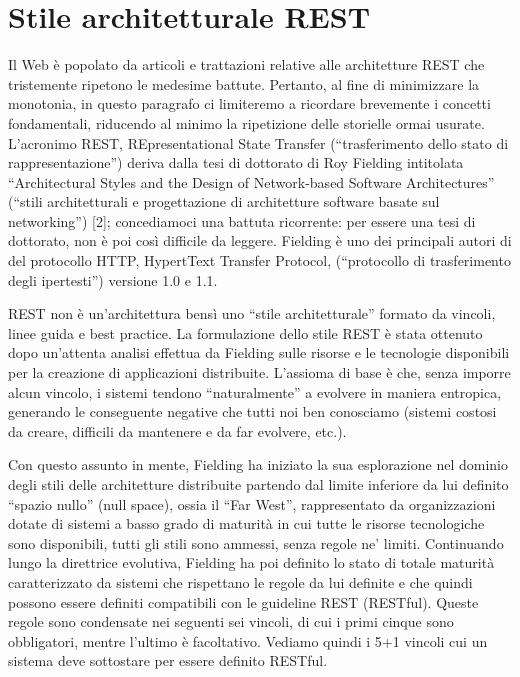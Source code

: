 \section{Stile architetturale REST}
Il Web \`e popolato da articoli e trattazioni relative alle architetture REST che tristemente ripetono le medesime battute. Pertanto, al fine di minimizzare la monotonia, in questo paragrafo ci limiteremo a ricordare brevemente i concetti fondamentali, riducendo al minimo la ripetizione delle storielle ormai usurate. L’acronimo REST, REpresentational State Transfer (“trasferimento dello stato di rappresentazione”) deriva dalla tesi di dottorato di Roy Fielding intitolata “Architectural Styles and the Design of Network-based Software Architectures” (“stili architetturali e progettazione di architetture software basate sul networking”) [2]; concediamoci una battuta ricorrente: per essere una tesi di dottorato, non \`e poi cos\`i difficile da leggere. Fielding \`e uno dei principali autori di del protocollo HTTP, HypertText Transfer Protocol, (“protocollo di trasferimento degli ipertesti”) versione 1.0 e 1.1.

REST non \`e un’architettura bens\`i uno “stile architetturale” formato da vincoli, linee guida e best practice. La formulazione dello stile REST \`e stata ottenuto dopo un’attenta analisi effettua da Fielding sulle risorse e le tecnologie disponibili per la creazione di applicazioni distribuite. L’assioma di base \`e che, senza imporre alcun vincolo, i sistemi tendono “naturalmente” a evolvere in maniera entropica, generando le conseguente negative che tutti noi ben conosciamo (sistemi costosi da creare, difficili da mantenere e da far evolvere, etc.).

Con questo assunto in mente, Fielding ha iniziato la sua esplorazione nel dominio degli stili delle architetture distribuite partendo dal limite inferiore da lui definito “spazio nullo” (null space), ossia il “Far West”, rappresentato da organizzazioni dotate di sistemi a basso grado di maturit\`a in cui tutte le risorse tecnologiche sono disponibili, tutti gli stili sono ammessi, senza regole ne’ limiti. Continuando lungo la direttrice evolutiva, Fielding ha poi definito lo stato di totale maturit\`a caratterizzato da sistemi che rispettano le regole da lui definite e che quindi possono essere definiti compatibili con le guideline REST (RESTful). Queste regole sono condensate nei seguenti sei vincoli, di cui i primi cinque sono obbligatori, mentre l’ultimo \`e facoltativo. Vediamo quindi i 5+1 vincoli cui un sistema deve sottostare per essere definito RESTful.